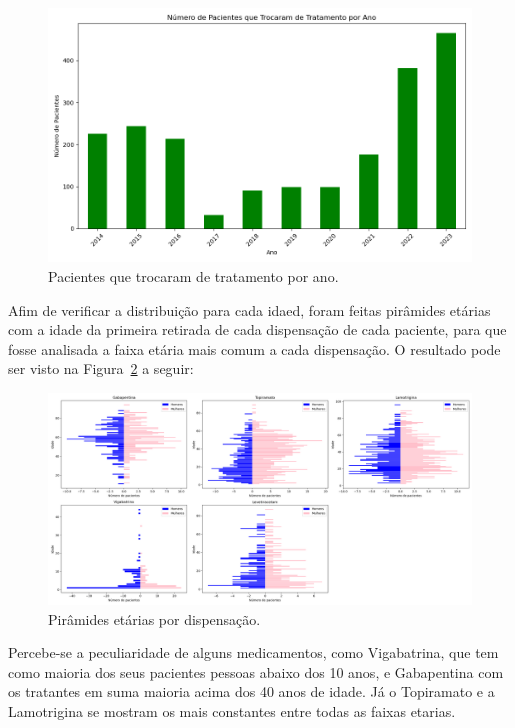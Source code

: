 \documentclass[article,a4paper,12pt,brazil,sumario=tradicional]{abntex2}
\begin{document}
\begin{figure}[!ht]
    \centering
    \includegraphics[width=1\textwidth]{pacientes_troca_tratamento_por_ano.png}
    \caption{Pacientes que trocaram de tratamento por ano.}
    \label{fig:pacientes_troca_tratamento_por_ano}
\end{figure}

Afim de verificar a distribuição para cada idaed, foram feitas pirâmides etárias com a idade da primeira retirada de cada dispensação de cada paciente, para que fosse analisada a faixa etária mais comum a cada dispensação. O resultado pode ser visto na Figura~\ref{fig:grid_piramides_etarias_medicamento} a seguir:

\begin{figure}[!ht]
    \centering
    \includegraphics[width=1\textwidth]{grid_piramides_etarias_medicamento.png}
    \caption{Pirâmides etárias por dispensação.}
    \label{fig:grid_piramides_etarias_medicamento}
\end{figure}

Percebe-se a peculiaridade de alguns medicamentos, como Vigabatrina, que tem como maioria dos seus pacientes pessoas abaixo dos 10 anos, e Gabapentina com os tratantes em suma maioria acima dos 40 anos de idade. Já o Topiramato e a Lamotrigina se mostram os mais constantes entre todas as faixas etarias.
\end{document}
